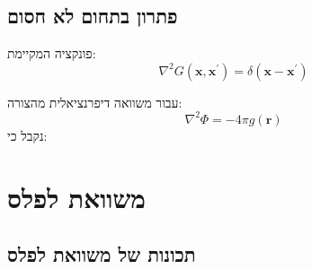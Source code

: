 \documentclass{tstextbook}
\begin{document}
\section{פתרון בתחום לא חסום}

\begin{definition}
פונקציה המקיימת:
$$\nabla^{2}G(\mathbf{x},\mathbf{x}^{\prime})=\delta(\mathbf{x}-\mathbf{x}^{\prime})$$

\end{definition}
\begin{proposition}
עבור משוואה דיפרנציאלית מהצורה:
$$\nabla^{2}\Phi=-4\pi g(\mathbf{r})$$
נקבל כי:

\end{proposition}
\chapter{משוואת לפלס}

\section{תכונות של משוואת לפלס}
\end{document}
